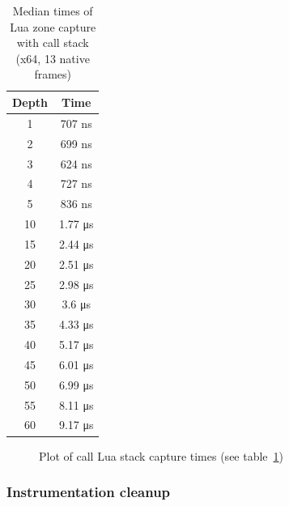 \documentclass[hidelinks,titlepage,a4paper]{article}
\begin{document}
\begin{table}[h]
\centering
\begin{tabular}[h]{c|c}
\textbf{Depth} & \textbf{Time} \\ \hline
1 & 707 \si{\nano\second} \\
2 & 699 \si{\nano\second} \\
3 & 624 \si{\nano\second} \\
4 & 727 \si{\nano\second} \\
5 & 836 \si{\nano\second} \\
10 & 1.77 \si{\micro\second} \\
15 & 2.44 \si{\micro\second} \\
20 & 2.51 \si{\micro\second} \\
25 & 2.98 \si{\micro\second} \\
30 & 3.6 \si{\micro\second} \\
35 & 4.33 \si{\micro\second} \\
40 & 5.17 \si{\micro\second} \\
45 & 6.01 \si{\micro\second} \\
50 & 6.99 \si{\micro\second} \\
55 & 8.11 \si{\micro\second} \\
60 & 9.17 \si{\micro\second}
\end{tabular}
\caption{Median times of Lua zone capture with call stack (x64, 13 native frames)}
\label{CallstackTimesLua}
\end{table}

\begin{figure}[h]
\centering{}
\caption{Plot of call Lua stack capture times (see table~\ref{CallstackTimesLua})}
\label{CallstackPlotLua}
\end{figure}

\subsubsection{Instrumentation cleanup}
\end{document}
